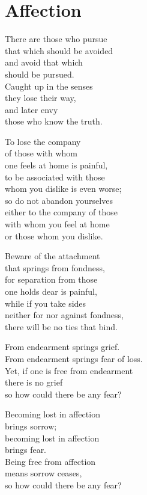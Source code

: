 
\chapter{Affection}


There are those who pursue\\
that which should be avoided\\
and avoid that which\\
should be pursued.\\
Caught up in the senses\\
they lose their way,\\
and later envy\\
those who know the truth.


To lose the company\\
of those with whom\\
one feels at home is painful,\\
to be associated with those\\
whom you dislike is even worse;\\
so do not abandon yourselves\\
either to the company of those\\
with whom you feel at home\\
or those whom you dislike.


Beware of the attachment\\
that springs from fondness,\\
for separation from those\\
one holds dear is painful,\\
while if you take sides\\
neither for nor against fondness,\\
there will be no ties that bind.


From endearment springs grief.\\
From endearment springs fear of loss.\\
Yet, if one is free from endearment\\
there is no grief\\
so how could there be any fear?


Becoming lost in affection\\
brings sorrow;\\
becoming lost in affection\\
brings fear.\\
Being free from affection\\
means sorrow ceases,\\
so how could there be any fear?


